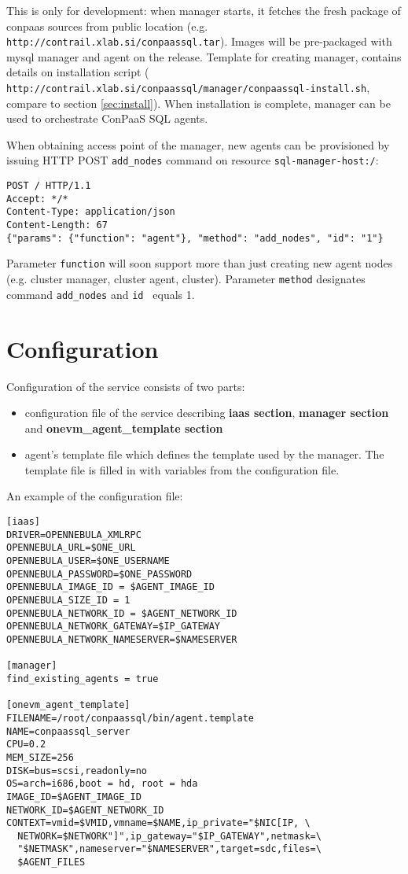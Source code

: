 \documentclass[a4paper,10pt]{article}
\begin{document}
This is only for development: when manager starts, it fetches the fresh package of conpaas sources from public location (e.g. \\{\tt http://contrail.xlab.si/conpaassql.tar}). Images will be pre-packaged with mysql manager and agent on the release. Template for creating manager, contains details on installation script (\\{\tt http://contrail.xlab.si/conpaassql/manager/conpaassql-install.sh}, compare to section \ref{sec:install}). When installation is complete, manager can be used to orchestrate ConPaaS SQL agents.

When obtaining access point of the manager, new agents can be provisioned by issuing HTTP POST {\tt add\_nodes} command on resource {\tt sql-manager-host:/}:

\begin{verbatim}
POST / HTTP/1.1
Accept: */*
Content-Type: application/json
Content-Length: 67
{"params": {"function": "agent"}, "method": "add_nodes", "id": "1"}
\end{verbatim}

Parameter {\tt function} will soon support more than just creating new agent nodes (e.g. cluster manager, cluster agent, cluster). Parameter {\tt method} designates command {\tt add\_nodes} and {\tt id } equals 1. 

\section{Configuration}

Configuration of the service consists of two parts:
\begin{itemize}
	\item configuration file of the service describing {\bf iaas section}, {\bf manager section} and {\bf onevm\_agent\_template section}
	\item agent's template file which defines the template used by the manager. The template file is filled in with variables from the configuration file.
\end{itemize}

An example of the configuration file:

\begin{Verbatim}[frame=single]
[iaas]
DRIVER=OPENNEBULA_XMLRPC
OPENNEBULA_URL=$ONE_URL
OPENNEBULA_USER=$ONE_USERNAME
OPENNEBULA_PASSWORD=$ONE_PASSWORD
OPENNEBULA_IMAGE_ID = $AGENT_IMAGE_ID
OPENNEBULA_SIZE_ID = 1
OPENNEBULA_NETWORK_ID = $AGENT_NETWORK_ID
OPENNEBULA_NETWORK_GATEWAY=$IP_GATEWAY
OPENNEBULA_NETWORK_NAMESERVER=$NAMESERVER

[manager]
find_existing_agents = true

[onevm_agent_template]
FILENAME=/root/conpaassql/bin/agent.template
NAME=conpaassql_server
CPU=0.2
MEM_SIZE=256
DISK=bus=scsi,readonly=no
OS=arch=i686,boot = hd, root = hda
IMAGE_ID=$AGENT_IMAGE_ID
NETWORK_ID=$AGENT_NETWORK_ID
CONTEXT=vmid=$VMID,vmname=$NAME,ip_private="$NIC[IP, \
  NETWORK=$NETWORK"]",ip_gateway="$IP_GATEWAY",netmask=\
  "$NETMASK",nameserver="$NAMESERVER",target=sdc,files=\
  $AGENT_FILES
\end{Verbatim}
\end{document}
